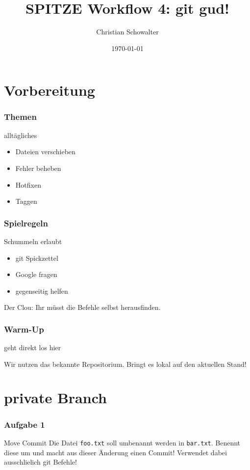 \documentclass{beamer}
\title{SPITZE Workflow 4: git gud!}
\author{Christian Schowalter}
\date{\today}
\begin{document}
\maketitle

\section{Vorbereitung}

\begin{frame}
	\frametitle{Themen}
	\begin{block}{alltägliches}
		\begin{itemize}
			\item Dateien verschieben
			\item Fehler beheben 
			\item Hotfixen
			\item Taggen
		\end{itemize}
	\end{block}
\end{frame}

\begin{frame}
	\frametitle{Spielregeln}
	\begin{block}{Schummeln erlaubt}
		\begin{itemize}
			\item git Spickzettel 
			\item Google fragen
			\item gegenseitig helfen
		\end{itemize}
	\end{block}
	\pause
	Der Clou: Ihr müsst die Befehle selbst herausfinden.
\end{frame}


\begin{frame}
	\frametitle{Warm-Up}
	\begin{block}{geht direkt los hier}
		\begin{itemize}
			Wir nutzen das bekannte Repositorium.
			Bringt es lokal auf den aktuellen Stand!
		\end{itemize}
	\end{block}
\end{frame}

\section{private Branch}


\begin{frame}
	\frametitle{Aufgabe 1}
	\begin{block}{Move Commit}
		Die Datei \texttt{foo.txt} soll umbenannt werden in \texttt{bar.txt}.
		Benennt diese um und macht aus dieser Änderung einen Commit!
		Verwendet dabei ausschlielich git Befehle!
	\end{block}
\end{frame}
\end{document}
